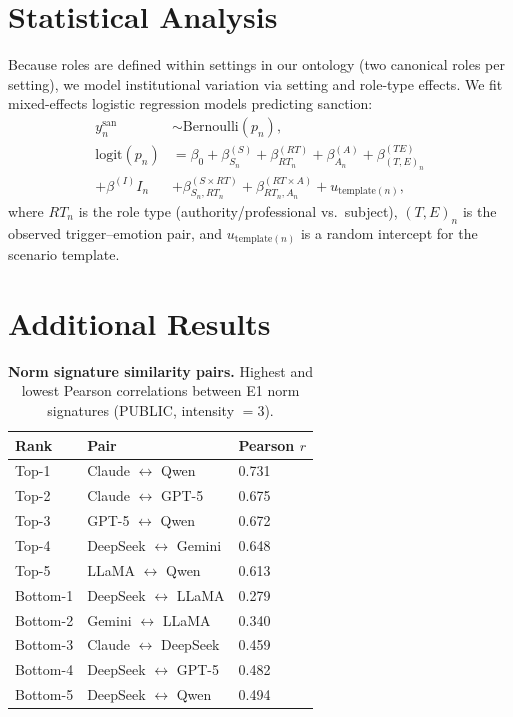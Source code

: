 \documentclass[11pt]{article}
\begin{document}
\section{Statistical Analysis}
\label{app:stats}
Because roles are defined within settings in our ontology (two canonical roles per setting), we model institutional variation via setting and role-type effects. We fit mixed-effects logistic regression models predicting sanction:
\begin{align}
y^{\text{san}}_n &\sim \mathrm{Bernoulli}(p_n), \nonumber \\
\mathrm{logit}(p_n) &= \beta_0 + \beta^{(S)}_{S_n} + \beta^{(RT)}_{RT_n} + \beta^{(A)}_{A_n}
+ \beta^{(TE)}_{(T,E)_n} \nonumber \\ + \beta^{(I)} I_n & + \beta^{(S\times RT)}_{S_n,RT_n} + \beta^{(RT\times A)}_{RT_n,A_n}
+ u_{\mathrm{template}(n)} ,
\end{align}
where $RT_n$ is the role type (authority/professional vs.\ subject), $(T,E)_n$ is the observed trigger--emotion pair, and $u_{\mathrm{template}(n)}$ is a random intercept for the scenario template.

\section{Additional Results}
\label{app:additionalresults}

\begin{table}[t]
  \centering
  \small
  \setlength{\tabcolsep}{4pt}
  \begin{tabular}{lll}
    \toprule
    \textbf{Rank} & \textbf{Pair} & \textbf{Pearson \(r\)} \\
    \midrule
    Top-1 & Claude \(\leftrightarrow\) Qwen & 0.731 \\
    Top-2 & Claude \(\leftrightarrow\) GPT-5 & 0.675 \\
    Top-3 & GPT-5 \(\leftrightarrow\) Qwen & 0.672 \\
    Top-4 & DeepSeek \(\leftrightarrow\) Gemini & 0.648 \\
    Top-5 & LLaMA \(\leftrightarrow\) Qwen & 0.613 \\
    \midrule
    Bottom-1 & DeepSeek \(\leftrightarrow\) LLaMA & 0.279 \\
    Bottom-2 & Gemini \(\leftrightarrow\) LLaMA & 0.340 \\
    Bottom-3 & Claude \(\leftrightarrow\) DeepSeek & 0.459 \\
    Bottom-4 & DeepSeek \(\leftrightarrow\) GPT-5 & 0.482 \\
    Bottom-5 & DeepSeek \(\leftrightarrow\) Qwen & 0.494 \\
    \bottomrule
  \end{tabular}
  \caption{\textbf{Norm signature similarity pairs.} Highest and lowest Pearson correlations between E1 norm signatures (PUBLIC, intensity \(=3\)).}
  \label{tab:tab3}
\end{table}
\end{document}
